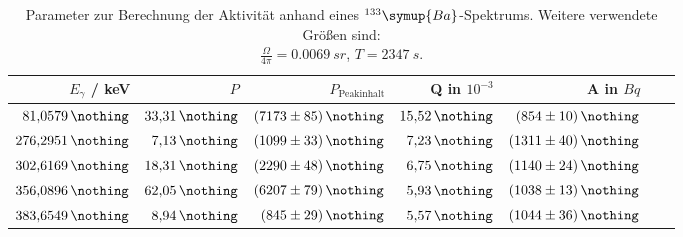 \begin{table}[h!]
  \centering
  \caption{Parameter zur Berechnung der Aktivität anhand eines $^{133}\symup{Ba}$-Spektrums. Weitere verwendete Größen sind: \\ $\frac{\Omega}{4 \pi} = \SI{0.0069}{sr}$, $T=\SI{2347}{s}$.}
  \label{tab:barium}
  \begin{tabular}{ r  r  r  r  r  r  r }
    \bottomrule
              $E_{\gamma}$ / keV \cite{nucleide} & $P$ \cite{nucleide}   & $P_{\text{Peakinhalt}}$    & Q in $10^{-3}$              & A in $Bq$\\ %
    \midrule
                $\SI{81.0579}{\nothing}$         & $\SI{33.31}{\nothing}$& $\SI{7173 (85)}{\nothing}$ & $\SI{15.52 }{\nothing}$     & $\SI{854 (10)}{\nothing}$      \\ %
                $\SI{276.2951}{\nothing}$        & $\SI{ 7.13}{\nothing}$& $\SI{1099 (33)}{\nothing}$ & $\SI{7.23 }{\nothing}$      & $\SI{1311 (40)}{\nothing}$     \\ %
                $\SI{302.6169}{\nothing}$        & $\SI{18.31}{\nothing}$& $\SI{2290 (48)}{\nothing}$ & $\SI{6.75 }{\nothing}$      & $\SI{1140 (24)}{\nothing}$     \\ %
                $\SI{356.0896}{\nothing}$        & $\SI{62.05}{\nothing}$& $\SI{6207 (79)}{\nothing}$ & $\SI{5.93 }{\nothing}$      & $\SI{1038 (13)}{\nothing}$     \\ %
                $\SI{383.6549}{\nothing}$        & $\SI{ 8.94}{\nothing}$& $\SI{ 845 (29)}{\nothing}$ & $\SI{5.57 }{\nothing}$      & $\SI{1044 (36)}{\nothing}$     \\ %
    \toprule
  \end{tabular}
\end{table}
